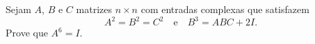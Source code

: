 Sejam \(A\), \(B\) e \(C\) matrizes \(n \times n\) com entradas complexas que satisfazem
\[
A^2 = B^2 = C^2 \quad \text{e} \quad B^3 = ABC + 2I.
\]
Prove que \(A^6 = I\).
